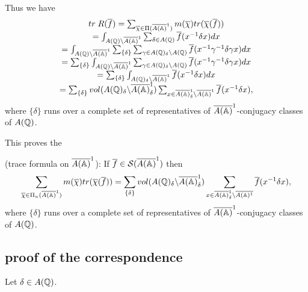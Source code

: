 Thus we have 
\begin{equation}
\begin{array}{c}
tr\;R(\overline{f})
=\sum_{\overline{\chi }\in \Pi (\overline{A({\Bbb{A}})}^1)}
m(\overline{\chi })tr(\overline{\chi }(\overline{f})) \\ 
=\int_{A({\Bbb{Q}})\backslash \overline{A({\Bbb{A}})}^1}
\sum_{\delta\in A({\Bbb{Q}})}
\overline{f}(x^{-1}\delta x)dx \\ 
=\int_{A({\Bbb{Q}})\backslash \overline{A({\Bbb{A}})}^1}
\sum_{\{\delta \}}
\sum_{\gamma \in A({\Bbb{Q}})_\delta\backslash A({\Bbb{Q}})}
\overline{f}(x^{-1}\gamma ^{-1}\delta \gamma x)dx \\ 
=\sum_{\{\delta \}}
\int_{A({\Bbb{Q}})\backslash \overline{A({\Bbb{A}})}^1}
\sum_{\gamma \in A({\Bbb{Q}})_\delta \backslash A({\Bbb{Q}})}
\overline{f}(x^{-1}\gamma ^{-1}\delta \gamma x)dx \\ 
=\sum_{\{\delta \}}
\int_{A({\Bbb{Q}})_\delta \backslash \overline{A({\Bbb{A}})}^1}
\overline{f}(x^{-1}\delta x)dx \\ 
=\sum_{\{\delta \}}
vol(A({\Bbb{Q}})_\delta \backslash \overline{A({\Bbb{A}})}_\delta ^1)
\sum_{x\in \overline{A({\Bbb{A}})}_\delta ^1
\backslash \overline{A({\Bbb{A}})}^1}
\overline{f}(x^{-1}\delta x),
\end{array}
\end{equation}
where $\{\delta \}$ runs over a complete set of representatives of
$\overline{A({\Bbb{A}})}^1$-conjugacy classes of $A({\Bbb{Q}})$.

This proves the

\begin{theorem}
(trace formula on $\overline{A({\Bbb{A}})}^1$):
If $\overline{f}\in {\cal{S}}(\overline{A({\Bbb{A}})}^1)$ then 
\[
\sum_{\overline{\chi }\in \Pi_u (\overline{A({\Bbb{A}})}^1)}
m(\overline{\chi })
tr(\overline{\chi }(\overline{f}))
=\sum_{\{\delta \}}
vol(A({\Bbb{Q}})_\delta \backslash \overline{A({\Bbb{A}})}_\delta ^1)
\sum_{x\in \overline{A({\Bbb{A}})}_\delta ^1
\backslash \overline{A({\Bbb{A}})^1}}
\overline{f}(x^{-1}\delta x),
\]
where $\{\delta \}$ runs over a complete set of representatives of
$\overline{A({\Bbb{A}})}^1$-conjugacy classes of
$A({\Bbb{Q}})$.
\end{theorem}

\subsection{proof of the correspondence}

Let $\delta\in A({\Bbb{Q}})$.


